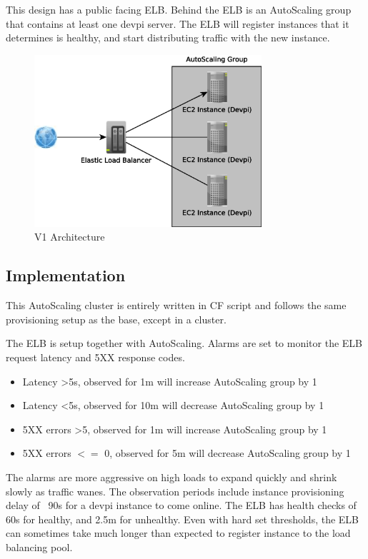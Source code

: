 \documentclass[12pt, letterpaper]{article}
\begin{document}
This design has a public facing ELB. Behind the ELB is an AutoScaling group that contains at least one devpi
server. The ELB will register instances that it determines is healthy, and start distributing traffic with the new instance.   

\begin{figure}[H]
    \caption{V1 Architecture}
    \centering
    \includegraphics[width=0.75\textwidth]{figures/v1_arch.eps}
\end{figure}

\subsection{Implementation}
This AutoScaling cluster is entirely written in CF script and follows the same provisioning setup as the base, except in a cluster.

The ELB is setup together with AutoScaling. Alarms are set to monitor the ELB request latency and 5XX response codes.

\begin{itemize}
    \item Latency \textgreater 5s, observed for 1m will increase AutoScaling group by 1
    \item Latency \textless 5s, observed for 10m will decrease AutoScaling group by 1
    \item 5XX errors \textgreater 5, observed for 1m will increase AutoScaling group by 1
    \item 5XX errors $<=$ 0, observed for 5m will decrease AutoScaling group by 1
\end{itemize}

The alarms are more aggressive on high loads to expand quickly and shrink slowly as traffic wanes. The observation periods
include instance provisioning delay of ~90s for a devpi instance to come online. The ELB has health checks of 60s for healthy, and
2.5m for unhealthy. Even with hard set thresholds, the ELB can sometimes take much longer than expected to register instance 
to the load balancing pool.
\end{document}
